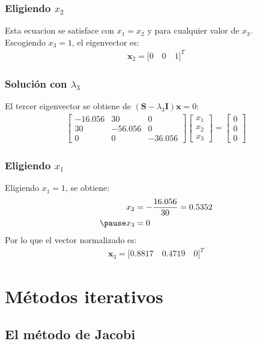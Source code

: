 \documentclass[12pt]{beamer}
\begin{document}
\begin{frame}
\frametitle{Eligiendo $x_{2}$}
Esta ecuacion se satisface con $x_{1} = x_{2}$ y para cualquier valor de $x_{3}$.
\\
\bigskip
\pause
Escogiendo $x_{3} = 1$, el eigenvector es:
\pause
\begin{align*}
\mathbf{x}_{2} = \big[ 0 \quad 0 \quad 1 \big]^{T}
\end{align*}
\end{frame}
\begin{frame}
\frametitle{Solución con $\lambda_{3}$}
El tercer eigenvector se obtiene de $(\mathbf{S} - \lambda_{3} \mathbf{I}) \mathbf{x} = 0$:
\pause
\begin{align*}
\begin{bmatrix}
-16.056 & 30 & 0 \\
30 & -56.056 & 0 \\
0 & 0 & -36.056
\end{bmatrix}
\begin{bmatrix}
x_{1} \\
x_{2} \\
x_{3}
\end{bmatrix}
= \begin{bmatrix}
0 \\
0 \\
0
\end{bmatrix}
\end{align*}
\end{frame}
\begin{frame}
\frametitle{Eligiendo $x_{1}$}
Eligiendo $x_{1} = 1$, \pause se obtiene:
\pause
\begin{eqnarray*}
\begin{aligned}
x_{2} &= - \dfrac{16.056}{30} = 0.5352 \\ \pause
x_{3} &= 0
\end{aligned}
\end{eqnarray*}
\pause
Por lo que el vector normalizado es:
\pause
\begin{align*}
\mathbf{x}_{3} = \big[ 0.8817 \quad 0.4719 \quad 0 \big]^{T}
\end{align*}
\end{frame}

\section{Métodos iterativos}
\subsection{El método de Jacobi}
\end{document}
